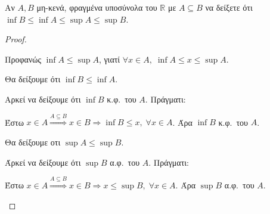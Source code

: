 \begin{mybox3}
\begin{prop}
  Αν $ A, B $ μη-κενά, φραγμένα υποσύνολα του 
  $ \mathbb{R} $ με $ A \subseteq B $ να δείξετε ότι 
  $ \inf B \leq \inf A \leq \sup A \leq \sup B $.
\end{prop}
\end{mybox3}
\begin{proof}
\item {} 
  \begin{myitemize}
    \item Προφανώς $ \inf A \leq \sup A $, γιατί $ \forall x \in A, \; 
      \inf A \leq x \leq \sup A $.
    \item Θα δείξουμε ότι $ \inf B \leq \inf A $. 

      Αρκεί να δείξουμε ότι $ \inf B $ κ.φ.\ του $A$. Πράγματι:

      Έστω $ x \in A \overset{A \subseteq B}{\Rightarrow} x \in B \Rightarrow 
      \inf B \leq x, \; \forall x \in A $. Άρα $ \inf B $ κ.φ.\ του $A$.
    \item Θα δείξουμε οτι $ \sup A \leq \sup B $. 

      Άρκεί να δείξουμε ότι $ \sup B $ α.φ.\ του $A$. Πράγματι:

      Έστω $ x \in A \overset{A \subseteq B}{\Rightarrow} x \in B \Rightarrow 
      x \leq \sup B, \; \forall x \in A $.  Άρα $ \sup B $ α.φ.\ του $A$.
  \end{myitemize}
\end{proof}

